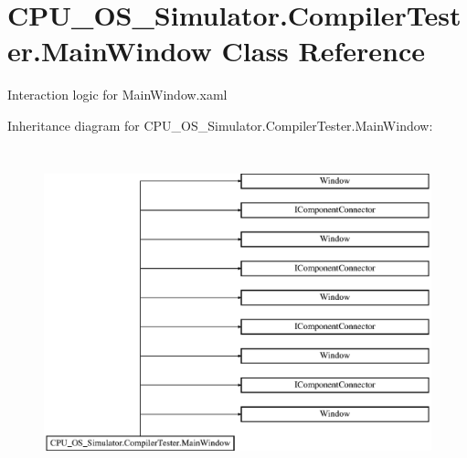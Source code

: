 \hypertarget{class_c_p_u___o_s___simulator_1_1_compiler_tester_1_1_main_window}{}\section{C\+P\+U\+\_\+\+O\+S\+\_\+\+Simulator.\+Compiler\+Tester.\+Main\+Window Class Reference}
\label{class_c_p_u___o_s___simulator_1_1_compiler_tester_1_1_main_window}


Interaction logic for Main\+Window.\+xaml  


Inheritance diagram for C\+P\+U\+\_\+\+O\+S\+\_\+\+Simulator.\+Compiler\+Tester.\+Main\+Window\+:\begin{figure}[H]
\begin{center}
\leavevmode
\includegraphics[height=9.523809cm]{class_c_p_u___o_s___simulator_1_1_compiler_tester_1_1_main_window}
\end{center}
\end{figure}
